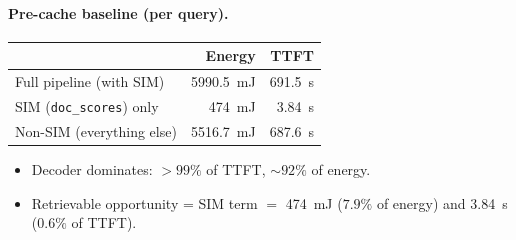 \documentclass[11pt]{article}
\begin{document}
\paragraph{Pre-cache baseline (per query).}
\begin{center}\small
\begin{tabular}{lrr}
\toprule
                                & Energy            & TTFT \\
\midrule
Full pipeline (with SIM)        & \SI{5990.5}{\milli\joule} & \SI{691.5}{\second} \\
SIM (\texttt{doc\_scores}) only & \SI{474}{\milli\joule}    & \SI{3.84}{\second}  \\
Non-SIM (everything else)       & \SI{5516.7}{\milli\joule} & \SI{687.6}{\second} \\
\bottomrule
\end{tabular}
\end{center}
\begin{itemize}
  \item Decoder dominates: $>99\%$ of TTFT, $\sim 92\%$ of energy.
  \item Retrievable opportunity = SIM term $=$ \SI{474}{\milli\joule} ($7.9\%$ of energy) and \SI{3.84}{\second} ($0.6\%$ of TTFT).
\end{itemize}
\end{document}
